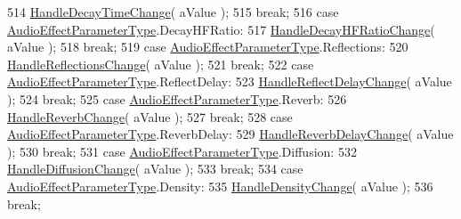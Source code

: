 \begin{DoxyCode}
514                     \hyperlink{class_a_t_i_1_1_audio_effect_handler_a35173ee088bc2459907af3521bcd69ac}{HandleDecayTimeChange}( aValue );
515                     \textcolor{keywordflow}{break};
516                 \textcolor{keywordflow}{case} \hyperlink{class_a_t_i_a1123d61b8dceb5867a3683e8d2224ee1}{AudioEffectParameterType}.DecayHFRatio:
517                     \hyperlink{class_a_t_i_1_1_audio_effect_handler_af00cbc35b44d68de0d2d0497e1defa3a}{HandleDecayHFRatioChange}( aValue );
518                     \textcolor{keywordflow}{break};
519                 \textcolor{keywordflow}{case} \hyperlink{class_a_t_i_a1123d61b8dceb5867a3683e8d2224ee1}{AudioEffectParameterType}.Reflections:
520                     \hyperlink{class_a_t_i_1_1_audio_effect_handler_af50ba52dba236a3b711172fd6bbc1bab}{HandleReflectionsChange}( aValue );
521                     \textcolor{keywordflow}{break};
522                 \textcolor{keywordflow}{case} \hyperlink{class_a_t_i_a1123d61b8dceb5867a3683e8d2224ee1}{AudioEffectParameterType}.ReflectDelay:
523                     \hyperlink{class_a_t_i_1_1_audio_effect_handler_ada336ed04fdb3360de3026ba8659c409}{HandleReflectDelayChange}( aValue );
524                     \textcolor{keywordflow}{break};
525                 \textcolor{keywordflow}{case} \hyperlink{class_a_t_i_a1123d61b8dceb5867a3683e8d2224ee1}{AudioEffectParameterType}.Reverb:
526                     \hyperlink{class_a_t_i_1_1_audio_effect_handler_aee7aa84aa7d433a7f7264aff131d5a6a}{HandleReverbChange}( aValue );
527                     \textcolor{keywordflow}{break};
528                 \textcolor{keywordflow}{case} \hyperlink{class_a_t_i_a1123d61b8dceb5867a3683e8d2224ee1}{AudioEffectParameterType}.ReverbDelay:
529                     \hyperlink{class_a_t_i_1_1_audio_effect_handler_a03f47bb2ac36fc9c672ccddd76af6e6a}{HandleReverbDelayChange}( aValue );
530                     \textcolor{keywordflow}{break};
531                 \textcolor{keywordflow}{case} \hyperlink{class_a_t_i_a1123d61b8dceb5867a3683e8d2224ee1}{AudioEffectParameterType}.Diffusion:
532                     \hyperlink{class_a_t_i_1_1_audio_effect_handler_adcf777de620420b6c411350db0eca2aa}{HandleDiffusionChange}( aValue );
533                     \textcolor{keywordflow}{break};
534                 \textcolor{keywordflow}{case} \hyperlink{class_a_t_i_a1123d61b8dceb5867a3683e8d2224ee1}{AudioEffectParameterType}.Density:
535                     \hyperlink{class_a_t_i_1_1_audio_effect_handler_acdbfbd384e2fdb5bd43ad977e264500a}{HandleDensityChange}( aValue );
536                     \textcolor{keywordflow}{break};

\end{DoxyCode}

